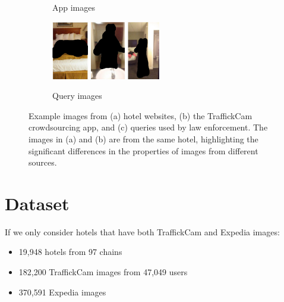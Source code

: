 \documentclass[letterpaper]{article} %
\begin{document}
\begin{figure}
\begin{subfigure}[b]{.6\textwidth}
    \caption{App images}
    \end{subfigure}
   \begin{subfigure}[b]{.3\textwidth}
   \centering
    \includegraphics[height=1in]{figures/example_images/queries/1.png}
    \includegraphics[height=1in]{figures/example_images/queries/2.png}
    \includegraphics[height=1in]{figures/example_images/queries/3.png}
    \caption{Query images}
    \end{subfigure}
    \caption[Image variability from different sources]{Example images from (a) hotel websites, (b) the TraffickCam crowdsourcing app, and (c) queries used by law enforcement. The images in (a) and (b) are from the same hotel, highlighting the significant differences in the properties of images from different sources.}
    \label{fig:domainImages}
\end{figure}

\section{Dataset}

If we only consider hotels that have both TraffickCam and Expedia images:
\begin{itemize}
\item 19,948 hotels from 97 chains
\item 182,200 TraffickCam images from 47,049 users
\item 370,591 Expedia images
\end{itemize}
\end{document}
